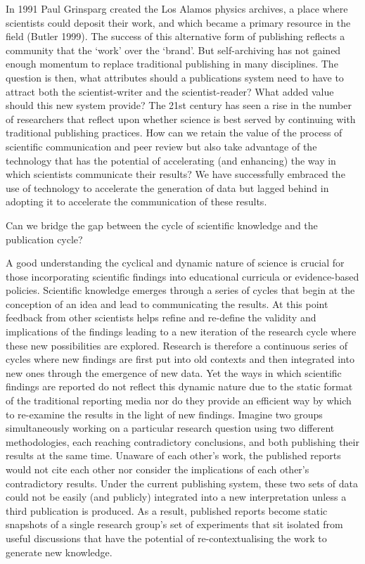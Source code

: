\documentclass[final,authoryear,3p]{elsarticle-open-drafting}
\begin{document}
In 1991 Paul Grinsparg created the Los Alamos physics archives, a place where scientists could deposit their work, and which became a primary resource in the field (Butler 1999). The success of this alternative form of publishing reflects a community that the ‘work’ over the ‘brand’. But self-archiving has not gained enough momentum to replace traditional publishing in many disciplines. The question is then, what attributes should a publications system need to have to attract both the scientist-writer and the scientist-reader? What added value should this new system provide?
The 21st century has seen a rise in the number of researchers that reflect upon whether science is best served by continuing with traditional publishing practices. How can we retain the value of the process of scientific communication and peer review but also take advantage of the technology that has the potential of accelerating (and enhancing) the way in which scientists communicate their results? We have successfully embraced the use of technology to accelerate the generation of data but lagged behind in adopting it to accelerate the communication of these results.

Can we bridge the gap between the cycle of scientific knowledge and the publication cycle?

A good understanding the cyclical and dynamic nature of science is crucial for those incorporating scientific findings into educational curricula or evidence-based policies. Scientific knowledge emerges through a series of cycles that begin at the conception of an idea and lead to communicating the results. At this point feedback from other scientists helps refine and re-define the validity and implications of the findings leading to a new iteration of the research cycle where these new possibilities are explored. Research is therefore a continuous series of cycles where new findings are first put into old contexts and then integrated into new ones through the emergence of new data. Yet the ways in which scientific findings are reported do not reflect this dynamic nature due to the static format of the traditional reporting media nor do they provide an efficient way by which to re-examine the results in the light of new findings. Imagine two groups simultaneously working on a particular research question using two different methodologies, each reaching contradictory conclusions, and both publishing their results at the same time. Unaware of each other’s work, the published reports would not cite each other nor consider the implications of each other’s contradictory results. Under the current publishing system, these two sets of data could not be easily (and publicly) integrated into a new interpretation unless a third publication is produced. As a result, published reports become static snapshots of a single research group’s set of experiments that sit isolated from useful discussions that have the potential of re-contextualising the work to generate new knowledge. 
\end{document}
